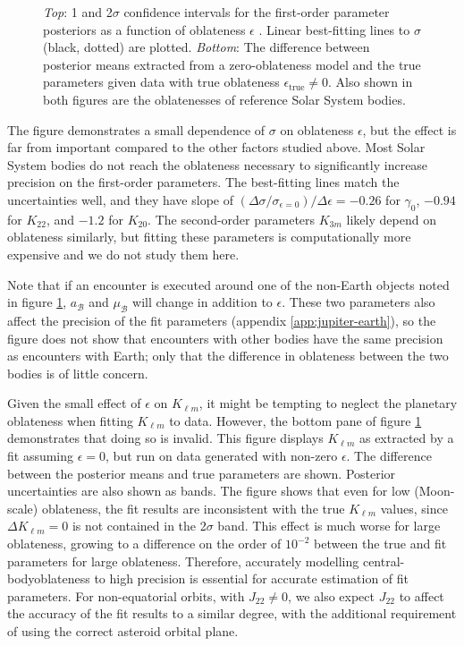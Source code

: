 \documentclass[fleqn,usenatbib]{mnras}
\begin{document}
\begin{figure}
  \caption{\textit{Top}: 1 and 2$\sigma$ confidence intervals for the first-order parameter posteriors as a function of oblateness $\epsilon$ . Linear best-fitting lines to $\sigma$ (black, dotted) are plotted. \textit{Bottom}: The difference between posterior means extracted from a zero-oblateness model and the true parameters given data with true oblateness $\epsilon_\text{true} \neq 0$. Also shown in both figures are the oblatenesses of reference Solar System bodies.}
  \label{fig:scan-oblateness}
\end{figure}

The figure demonstrates a small dependence of $\sigma$ on oblateness $\epsilon$, but the effect is far from important compared to the other factors studied above. Most Solar System bodies do not reach the oblateness necessary to significantly increase precision on the first-order parameters. The best-fitting lines match the uncertainties well, and they have slope of $(\Delta \sigma / \sigma_{\epsilon=0}) / \Delta \epsilon = -0.26$ for $\gamma_0$, $-0.94$ for $K_{22}$, and $-1.2$ for $K_{20}$. The second-order parameters $K_{3m}$ likely depend on oblateness similarly, but fitting these parameters is computationally more expensive and we do not study them here.

Note that if an encounter is executed around one of the non-Earth objects noted in figure \ref{fig:scan-oblateness}, $a_\mathcal{B}$ and $\mu_\mathcal{B}$ will change in addition to $\epsilon$. These two parameters also affect the precision of the fit parameters (appendix \ref{app:jupiter-earth}), so the figure does not show that encounters with other bodies have the same precision as encounters with Earth; only that the difference in oblateness between the two bodies is of little concern.

Given the small effect of $\epsilon$ on $K_{\ell m}$, it might be tempting to neglect the planetary oblateness when fitting $K_{\ell m}$ to data. However, the bottom pane of figure \ref{fig:scan-oblateness} demonstrates that doing so is invalid. This figure displays $K_{\ell m}$ as extracted by a fit assuming $\epsilon = 0$, but run on data generated with non-zero $\epsilon$. The difference between the posterior means and true parameters are shown. Posterior uncertainties are also shown as bands. The figure shows that even for low (Moon-scale) oblateness, the fit results are inconsistent with the true $K_{\ell m}$ values, since $\Delta K_{\ell m} = 0$ is not contained in the 2$\sigma$ band. This effect is much worse for large oblateness, growing to a difference on the order of $10^{-2}$ between the true and fit parameters for large oblateness. Therefore, accurately modelling central-bodyoblateness to high precision is essential for accurate estimation of fit parameters. For non-equatorial orbits, with $J_{22} \neq 0$, we also expect $J_{22}$ to affect the accuracy of the fit results to a similar degree, with the additional requirement of using the correct asteroid orbital plane.
\end{document}
